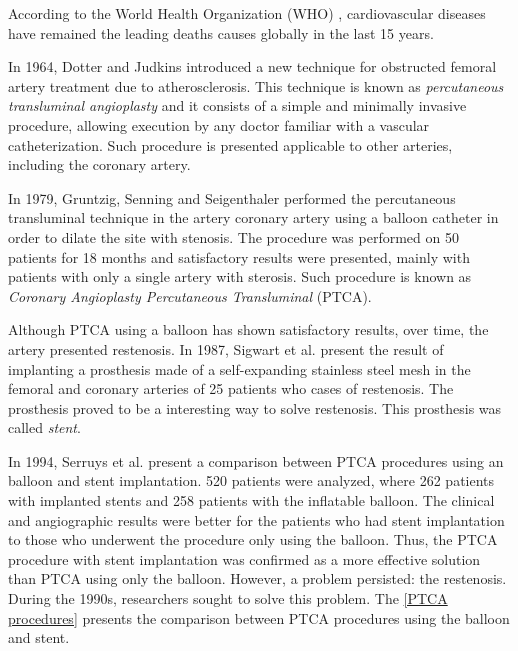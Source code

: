 According to the World Health Organization (WHO) \cite{oms2018},
cardiovascular diseases have remained the leading
deaths causes globally in the last 15 years.

\medskip
In 1964, Dotter and Judkins \cite{dotter1964} 
introduced a new technique for obstructed femoral artery treatment
 due to atherosclerosis. This technique is
known as \textit{percutaneous transluminal angioplasty} and
 it consists of a simple and minimally invasive procedure,
 allowing execution by any doctor familiar with a vascular
 catheterization. Such procedure is presented applicable to
 other arteries, including the coronary artery.


\medskip
In 1979, Gruntzig, Senning and Seigenthaler \cite{gruntzig1979}
 performed the percutaneous transluminal technique in the artery
coronary artery using a balloon catheter in order to dilate the site
with stenosis. 
The procedure was performed on 50 patients for 18 months and
satisfactory results were presented, mainly with patients with only
a single artery with sterosis. 
Such procedure is known as \textit{Coronary Angioplasty
Percutaneous Transluminal} (PTCA).

\medskip
Although PTCA using a balloon has shown satisfactory results,
over time, the artery presented restenosis. 
In 1987, Sigwart et al. \cite{sigwart1987}
present the result of implanting a prosthesis made of a 
self-expanding stainless steel mesh in the femoral and 
coronary arteries of 25 patients who cases of restenosis. 
The prosthesis proved to be a
interesting way to solve restenosis. 
This prosthesis was called \textit{stent}.


\medskip
In 1994, Serruys et al. \cite{serruys1994} present a comparison between PTCA procedures
using an balloon and stent implantation. 520 patients were analyzed,
where 262 patients with implanted stents and 258 patients with the
inflatable balloon. The clinical and angiographic results were better for the patients who had stent implantation to those who underwent the procedure only
using the balloon. Thus, the PTCA procedure with stent implantation
was confirmed as a more effective solution than PTCA using only the balloon.
However, a problem persisted: the restenosis. 
During the 1990s, researchers
sought to solve this problem. The \ref{PTCA procedures} presents the comparison between
PTCA procedures using the balloon and stent.

